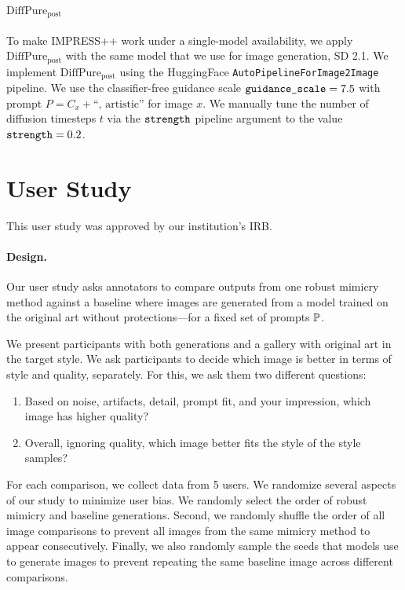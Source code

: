 \documentclass{article}
\begin{document}
\paragraph{$\text{DiffPure}_{\text{post}}$}\label{sec:diffpurepostexp} To make IMPRESS++ work under a single-model availability, we apply $\text{DiffPure}_{\text{post}}$ with the same model that we use for image generation, SD 2.1. We implement $\text{DiffPure}_{\text{post}}$ using the HuggingFace \texttt{AutoPipelineForImage2Image} pipeline. We use the classifier-free guidance scale $\text{\texttt{guidance\_scale}} = 7.5$ with prompt $P = C_x + \text{``, artistic''}$ for image $x$.
We manually tune the number of diffusion timesteps $t$ via the $\text{\texttt{strength}}$ pipeline argument to the value $\text{\texttt{strength}} = 0.2$.

\section{User Study}
\label{sec:userstudy}

This user study was approved by our institution's IRB.

\paragraph{Design.}

Our user study asks annotators to compare outputs from one robust mimicry method against a baseline where images are generated from a model trained on the original art without protections---for a fixed set of prompts ${\mathbb{P}}$. 

We present participants with both generations and a gallery with original art in the target style.
We ask participants to decide which image is better in terms of style and quality, separately. For this, we ask them two different questions:
\begin{enumerate}
    \item Based on noise, artifacts, detail, prompt fit, and your impression, which image has higher quality?
    \item Overall, ignoring quality, which image better fits the style of the style samples?
\end{enumerate}

For each comparison, we collect data from 5 users. We randomize several aspects of our study to minimize user bias. We randomly select the order of robust mimicry and baseline generations. Second, we randomly shuffle the order of all image comparisons to prevent all images from the same mimicry method to appear consecutively. Finally, we also randomly sample the seeds that models use to generate images to prevent repeating the same baseline image across different comparisons.
\end{document}
